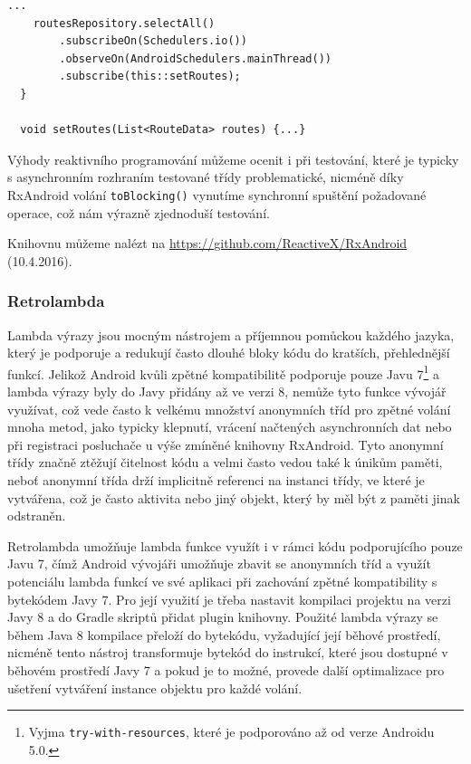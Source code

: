 \documentclass[czech,master,public,dept460,male,java,cpdeclaration]{diploma}
\begin{document}
\begin{lstlisting}[label=rxmainthreaddeliver,caption=Reakce na událost v UI vlákně pomocí RxAndorid]
    ...
    routesRepository.selectAll()
        .subscribeOn(Schedulers.io())
        .observeOn(AndroidSchedulers.mainThread())
        .subscribe(this::setRoutes);
  }

  void setRoutes(List<RouteData> routes) {...}
\end{lstlisting}

Výhody reaktivního programování můžeme ocenit i při testování, které je typicky s asynchronním
rozhraním testované třídy problematické, nicméně díky RxAndroid volání \texttt{toBlocking()} vynutíme
synchronní spuštění požadované operace, což nám výrazně zjednoduší testování.

Knihovnu můžeme nalézt na \url{https://github.com/ReactiveX/RxAndroid} (10.4.2016).

\subsubsection{Retrolambda}
Lambda výrazy jsou mocným nástrojem a příjemnou pomůckou každého jazyka, který je podporuje a redukují
často dlouhé bloky kódu do kratších, přehlednější funkcí. Jelikož Android kvůli zpětné
kompatibilitě podporuje pouze Javu 7\footnote{Vyjma \texttt{try-with-resources},
které je podporováno až od verze Androidu 5.0.}
a lambda výrazy byly do Javy přidány až ve verzi 8, nemůže tyto funkce vývojář využívat,
což vede často k velkému množství anonymních tříd pro zpětné volání mnoha metod, jako typicky klepnutí,
vrácení načtených asynchronních dat nebo při registraci posluchače u výše zmíněné knihovny RxAndroid.
Tyto anonymní třídy značně ztěžují čitelnost kódu a velmi často vedou také k únikům paměti,
neboť anonymní třída drží implicitně referenci na instanci třídy, ve které je vytvářena, což je často
aktivita nebo jiný objekt, který by měl být z paměti jinak odstraněn.

Retrolambda umožňuje lambda funkce využít i v rámci kódu podporujícího pouze Javu 7,
čímž Android vývojáři umožňuje zbavit se anonymních tříd a využít potenciálu lambda funkcí
ve své aplikaci při zachování zpětné kompatibility s bytekódem Javy 7. Pro její využití je třeba
nastavit kompilaci projektu na verzi Javy 8 a do Gradle skriptů přidat plugin knihovny. Použité
lambda výrazy se během Java 8 kompilace přeloží do bytekódu, vyžadující její běhové prostředí,
nicméně tento nástroj transformuje bytekód do instrukcí, které jsou dostupné v běhovém prostředí
Javy 7 a pokud je to možné, provede další optimalizace pro ušetření vytváření instance objektu
pro každé volání.
\end{document}
